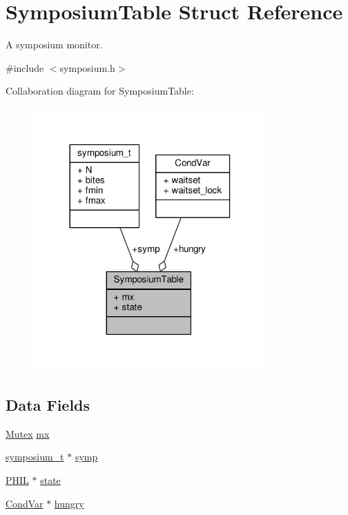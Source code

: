 \hypertarget{structSymposiumTable}{}\section{Symposium\+Table Struct Reference}
\label{structSymposiumTable}


A symposium monitor.  




{\ttfamily \#include $<$symposium.\+h$>$}



Collaboration diagram for Symposium\+Table\+:\nopagebreak
\begin{figure}[H]
\begin{center}
\leavevmode
\includegraphics[width=254pt]{structSymposiumTable__coll__graph}
\end{center}
\end{figure}
\subsection*{Data Fields}
\begin{DoxyCompactItemize}
\item 
\hyperlink{group__syscalls_gaef2ec62cae8e0031fd19fc8b91083ade}{Mutex} \hyperlink{structSymposiumTable_a8c36f26f523e6b2f99f6e70fff098de8}{mx}
\item 
\hyperlink{structsymposium__t}{symposium\+\_\+t} $\ast$ \hyperlink{structSymposiumTable_a4089e2778ba23eb79c4785eb5702f70f}{symp}
\item 
\hyperlink{symposium_8h_a9fced5fb7d50a8fa2e8ae45b0cae3520}{P\+H\+IL} $\ast$ \hyperlink{structSymposiumTable_a70507f28df670d0db2e59fc65309af08}{state}
\item 
\hyperlink{structCondVar}{Cond\+Var} $\ast$ \hyperlink{structSymposiumTable_a6daa1fdbfe8e836e72bfd6953bc91f6e}{hungry}
\end{DoxyCompactItemize}


